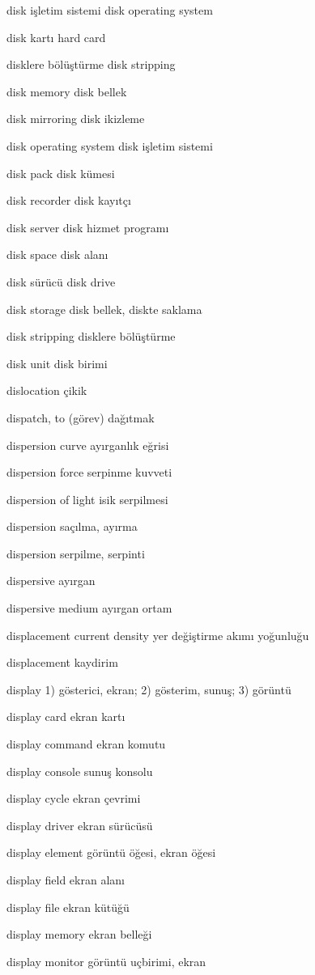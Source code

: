 \documentclass[12pt,fleqn]{article}\usepackage{../../common}
\begin{document}
disk işletim sistemi disk operating system

disk kartı hard card

disklere bölüştürme disk stripping

disk memory disk bellek

disk mirroring disk ikizleme

disk operating system disk işletim sistemi

disk pack disk kümesi

disk recorder disk kayıtçı

disk server disk hizmet programı

disk space disk alanı

disk sürücü disk drive

disk storage disk bellek, diskte saklama

disk stripping disklere bölüştürme

disk unit disk birimi

dislocation çikik

dispatch, to (görev) dağıtmak

dispersion curve ayırganlık eğrisi

dispersion force serpinme kuvveti

dispersion of light isik serpilmesi

dispersion saçılma, ayırma

dispersion serpilme, serpinti

dispersive ayırgan

dispersive medium ayırgan ortam

displacement current density yer değiştirme akımı yoğunluğu

displacement kaydirim

display 1) gösterici, ekran; 2) gösterim, sunuş; 3) görüntü

display card ekran kartı

display command ekran komutu

display console sunuş konsolu

display cycle ekran çevrimi

display driver ekran sürücüsü

display element görüntü öğesi, ekran öğesi

display field ekran alanı

display file ekran kütüğü

display memory ekran belleği

display monitor görüntü uçbirimi, ekran
\end{document}
